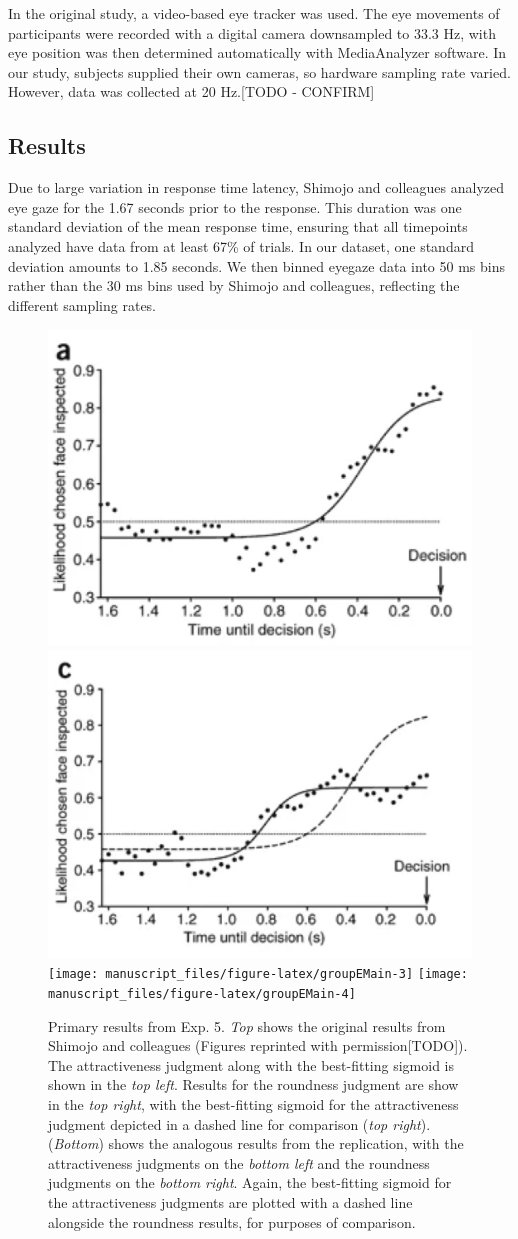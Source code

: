 \documentclass[
  man,floatsintext]{apa6}
\begin{document}
In the original study, a video-based eye tracker was used. The eye
movements of participants were recorded with a digital camera
downsampled to 33.3 Hz, with eye position was then determined
automatically with MediaAnalyzer software. In our study, subjects
supplied their own cameras, so hardware sampling rate varied. However,
data was collected at 20 Hz.{[}TODO - CONFIRM{]}

\hypertarget{results-4}{%
\subsection{Results}\label{results-4}}

Due to large variation in response time latency, Shimojo and colleagues analyzed eye gaze for the 1.67 seconds prior to the response. This duration was one standard deviation of the mean response time, ensuring that all timepoints analyzed have data from at least 67\% of trials. In our dataset, one standard deviation amounts to 1.85 seconds. We then binned eyegaze data into 50 ms bins rather than the 30 ms bins used by Shimojo and colleagues, reflecting the different sampling rates.



\begin{figure}
\includegraphics[width=0.45\linewidth]{figGroupEOrigA} \includegraphics[width=0.45\linewidth]{figGroupEOrigB} \texttt{[image: manuscript\_files/figure-latex/groupEMain-3]} \texttt{[image: manuscript\_files/figure-latex/groupEMain-4]} \caption{Primary results from Exp. 5. \emph{Top} shows the original results from Shimojo and colleagues (Figures reprinted with permission{[}TODO{]}). The attractiveness judgment along with the best-fitting sigmoid is shown in the \emph{top left}. Results for the roundness judgment are show in the \emph{top right}, with the best-fitting sigmoid for the attractiveness judgment depicted in a dashed line for comparison (\emph{top right}). (\emph{Bottom}) shows the analogous results from the replication, with the attractiveness judgments on the \emph{bottom left} and the roundness judgments on the \emph{bottom right}. Again, the best-fitting sigmoid for the attractiveness judgments are plotted with a dashed line alongside the roundness results, for purposes of comparison.}\label{fig:groupEMain}
\end{figure}
\end{document}
